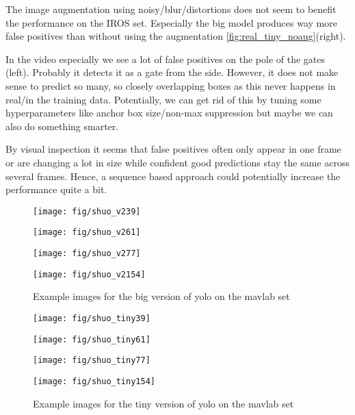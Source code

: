 \documentclass{article}
\begin{document}
The image augmentation using noisy/blur/distortions does not seem to benefit the performance on the IROS set. Especially the big model produces way more false positives than without using the augmentation \autoref{fig:real_tiny_noaug}(right).

In the video especially we see a lot of false positives on the pole of the gates (left). Probably it detects it as a gate from the side. However, it does not make sense to predict so many, so closely overlapping boxes as this never happens in real/in the training data. Potentially, we can get rid of this by tuning some hyperparameters like anchor box size/non-max suppression but maybe we can also do something smarter.

By visual inspection it seems that false positives often only appear in one frame or are changing a lot in size while confident good predictions stay the same across several frames. Hence, a sequence based approach could potentially increase the performance quite a bit.


\begin{figure}[htbp]
	\centering
	
	\begin{minipage}{0.24\textwidth}
		\centering
		\texttt{[image: fig/shuo\_v239]}
	\end{minipage}
	\begin{minipage}{0.24\textwidth}
		\centering
		\texttt{[image: fig/shuo\_v261]}
	\end{minipage}
	\begin{minipage}{0.24\textwidth}
		\centering
		\texttt{[image: fig/shuo\_v277]}
	\end{minipage}
	\begin{minipage}{0.24\textwidth}
		\centering
		\texttt{[image: fig/shuo\_v2154]}
	\end{minipage}
	\caption{Example images for the big version of yolo on the mavlab set}
	\label{fig:real_yolov2_shuo}
	
	\begin{minipage}{0.24\textwidth}
		\centering
		\texttt{[image: fig/shuo\_tiny39]}
	\end{minipage}
	\begin{minipage}{0.24\textwidth}
		\centering
		\texttt{[image: fig/shuo\_tiny61]}
	\end{minipage}
	\begin{minipage}{0.24\textwidth}
		\centering
		\texttt{[image: fig/shuo\_tiny77]}
	\end{minipage}
	\begin{minipage}{0.24\textwidth}
		\centering
		\texttt{[image: fig/shuo\_tiny154]}
	\end{minipage}
	\caption{Example images for the tiny version of yolo on the mavlab set}
	\label{fig:real_tiny_shuo}
\end{figure}
\end{document}
